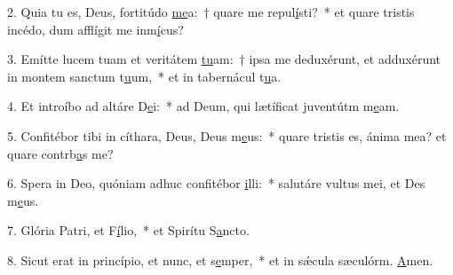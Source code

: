 2. Quia tu es, Deus, fortitúdo \uline{me}a:~† quare me repul\uline{í}sti?~* et quare tristis incédo, dum afflígit me inm\uline{í}cus?\par 
3. Emítte lucem tuam et veritátem \uline{tu}am:~† ipsa me deduxérunt, et adduxérunt in montem sanctum t\uline{u}um,~* et in tabernácul t\uline{u}a.\par 
4. Et introíbo ad altáre D\uline{e}i:~* ad Deum, qui lætíficat juventútm m\uline{e}am.\par 
5. Confitébor tibi in cíthara, Deus, Deus m\uline{e}us:~* quare tristis es, ánima mea? et quare contrb\uline{a}s me?\par 
6. Spera in Deo, quóniam adhuc confitébor \uline{i}lli:~* salutáre vultus mei, et Des m\uline{e}us.\par 
7. Glória Patri, et F\uline{í}lio,~* et Spirítu S\uline{a}ncto.\par 
8. Sicut erat in princípio, et nunc, et s\uline{e}mper,~* et in sǽcula sæculórm. \uline{A}men.\par 
